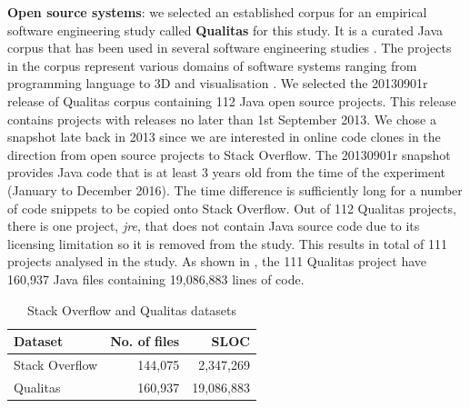 \documentclass{sig-alternate-05-2015}
\begin{document}
\textbf{Open source systems}: we selected an established corpus for an empirical software engineering study called \textbf{Qualitas} \cite{QualitasCorpus} for this study. It is a curated Java corpus that has been used in several software engineering studies \cite{Taube-Schock2011,Beckman2011,Vasilescu2011,Omar2012}. The projects in the corpus represent various domains of software systems ranging from programming language to 3D and visualisation \cite{QualitasCorpus}. We selected the 20130901r release of Qualitas corpus containing 112 Java open source projects. This release contains projects with releases no later than 1st September 2013. We chose a snapshot late back in 2013 since we are interested in online code clones in the direction from open source projects to Stack Overflow. The 20130901r snapshot provides Java code that is at least 3 years old from the time of the experiment (January to December 2016). The time difference is sufficiently long for a number of code snippets to be copied onto Stack Overflow. Out of 112 Qualitas projects, there is one project, \textit{jre}, that does not contain Java source code due to its licensing limitation \cite{QualitasCorpus} so it is removed from the study. This results in total of 111 projects analysed in the study. As shown in , the 111 Qualitas project have 160,937 Java files containing 19,086,883 lines of code. %

\begin{table}
	\centering
	\caption{Stack Overflow and Qualitas datasets}
	\label{tab:datasets}
	\small
	\begin{tabular}{l|r|r}
		\hline 
		Dataset & No. of files & SLOC \\
		\hline
		Stack Overflow & 144,075 & 2,347,269 \\ 
		\hline 
		Qualitas &  160,937 & 19,086,883 \\ 
		\hline 
	\end{tabular} 
\end{table}
\end{document}
